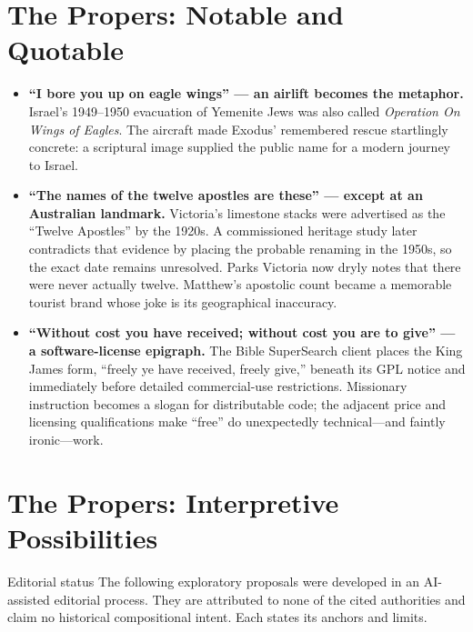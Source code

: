 \section*{The Propers: Notable and Quotable}

{\small
\begin{itemize}
\item \textbf{“I bore you up on eagle wings” --- an airlift becomes the metaphor.\enspace{}} Israel's 1949--1950 evacuation of Yemenite Jews was also called \emph{Operation On Wings of Eagles}. The aircraft made Exodus' remembered rescue startlingly concrete: a scriptural image supplied the public name for a modern journey to Israel.

\item \textbf{“The names of the twelve apostles are these” --- except at an Australian landmark.\enspace{}} Victoria's limestone stacks were advertised as the “Twelve Apostles” by the 1920s. A commissioned heritage study later contradicts that evidence by placing the probable renaming in the 1950s, so the exact date remains unresolved. Parks Victoria now dryly notes that there were never actually twelve. Matthew's apostolic count became a memorable tourist brand whose joke is its geographical inaccuracy.

\item \textbf{“Without cost you have received; without cost you are to give” --- a software-license epigraph.\enspace{}} The Bible SuperSearch client places the King James form, “freely ye have received, freely give,” beneath its GPL notice and immediately before detailed commercial-use restrictions. Missionary instruction becomes a slogan for distributable code; the adjacent price and licensing qualifications make “free” do unexpectedly technical---and faintly ironic---work.
\end{itemize}
}

\section*{The Propers: Interpretive Possibilities}

\begin{studybox}{Editorial status}
The following exploratory proposals were developed in an AI-assisted editorial process. They are attributed to none of the cited authorities and claim no historical compositional intent. Each states its anchors and limits.
\end{studybox}

